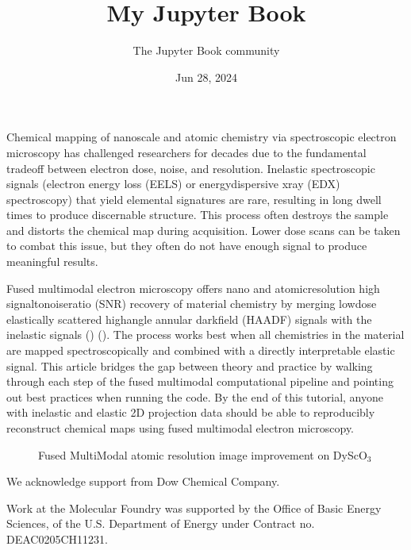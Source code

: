 \documentclass[letterpaper,10pt,english]{jupyterBook}
\title{My Jupyter Book}
\date{Jun 28, 2024}
\author{The Jupyter Book community}
\let\sphinxpxdimen\pdfpxdimen\else\newdimen\sphinxpxdimen
\begin{document}
\pagestyle{empty}
\sphinxmaketitle
\pagestyle{plain}
\sphinxtableofcontents
\pagestyle{normal}
\label{\detokenize{index::doc}}
\sphinxAtStartPar
Chemical mapping of nano\sphinxhyphen{}scale and atomic chemistry via spectroscopic electron microscopy has challenged researchers for decades due to the fundamental tradeoff between electron dose, noise, and resolution. Inelastic spectroscopic signals (electron energy loss (EELS) or energy\sphinxhyphen{}dispersive x\sphinxhyphen{}ray (EDX) spectroscopy) that yield elemental signatures are rare, resulting in long dwell times to produce discernable structure. This process often destroys the sample and distorts the chemical map during acquisition.  Lower dose scans can be taken to combat this issue, but they often do not have enough signal to produce meaningful results.

\sphinxAtStartPar
Fused multi\sphinxhyphen{}modal electron microscopy offers nano\sphinxhyphen{} and atomic\sphinxhyphen{}resolution high signal\sphinxhyphen{}to\sphinxhyphen{}noise\sphinxhyphen{}ratio (SNR) recovery of material chemistry by merging low\sphinxhyphen{}dose elastically scattered high\sphinxhyphen{}angle annular dark\sphinxhyphen{}field (HAADF) signals with the inelastic signals () (). The process works best when all chemistries in the material are mapped spectroscopically and combined with a directly interpretable elastic signal. This article bridges the gap between theory and practice by walking through each step of the fused multi\sphinxhyphen{}modal computational pipeline and pointing out best practices when running the code. By the end of this tutorial, anyone with inelastic and elastic 2D projection data should be able to reproducibly  reconstruct chemical maps using fused multi\sphinxhyphen{}modal electron microscopy.

\begin{figure}[htbp]
\centering
\capstart

\noindent\sphinxincludegraphics[width=700\sphinxpxdimen]{{Figure_abstract1}.png}
\caption{Fused Multi\sphinxhyphen{}Modal atomic resolution image improvement on  DyScO\(_3\)}\label{\detokenize{index:fig-abstract}}\end{figure}



\sphinxAtStartPar
We acknowledge support from Dow Chemical Company.

\sphinxAtStartPar
Work at the Molecular Foundry was supported by the Office of Basic Energy Sciences, of the U.S. Department of Energy under Contract no. DE\sphinxhyphen{}AC02\sphinxhyphen{}05CH11231.
\end{document}
